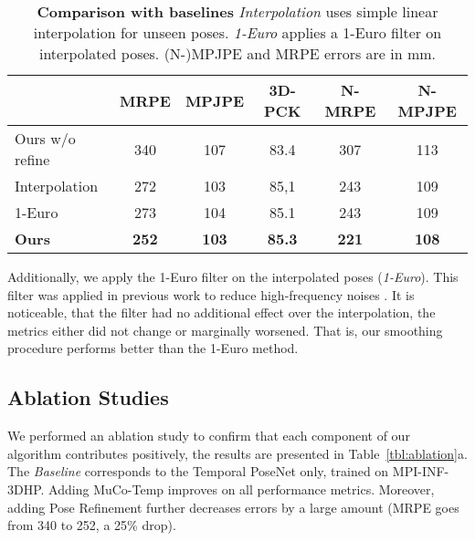 \documentclass[runningheads, envcountsame, a4paper]{llncs}
\begin{document}
\begin{table}[h]
\centering
\caption{\textbf{Comparison with baselines} \textit{Interpolation} uses simple linear interpolation for unseen poses. \textit{1-Euro} applies a 1-Euro filter on interpolated poses. (N-)MPJPE and MRPE errors are in mm.}\label{tbl:interpol}
\begin{tabular}{lccccc}
 & MRPE  & MPJPE &  3D-PCK & N-MRPE & N-MPJPE \\
\hline
Ours w/o refine & 340 & 107  & 83.4  &307 & 113\\ Interpolation & 272 & 103 & 85,1 &  243 & 109 \\ 
1-Euro & 273 & 104 & 85.1 & 243 & 109 \\
\textbf{Ours} & \textbf{252} & \textbf{103}  & \textbf{85.3} & \textbf{221} & \textbf{108} \\
\hline
\end{tabular}
\end{table}


Additionally, we apply the 1-Euro filter \cite{casiez2012one_euro} on the interpolated poses (\textit{1-Euro}). This filter was applied in previous work to reduce high-frequency noises \cite{vnect,zou2020footskating}. It is noticeable, that the filter had no additional effect over the interpolation, the metrics either did not change or marginally worsened. That is, our smoothing procedure performs better than the 1-Euro method.

\subsection{Ablation Studies}

We performed an ablation study to confirm that each component of our algorithm contributes positively, the results are presented in Table~\ref{tbl:ablation}a. The \textit{Baseline} corresponds to the Temporal PoseNet only, trained on MPI-INF-3DHP. Adding MuCo-Temp improves on all performance metrics. Moreover, adding Pose Refinement further decreases errors by a large amount (MRPE goes from 340 to 252, a 25\% drop).
\end{document}
